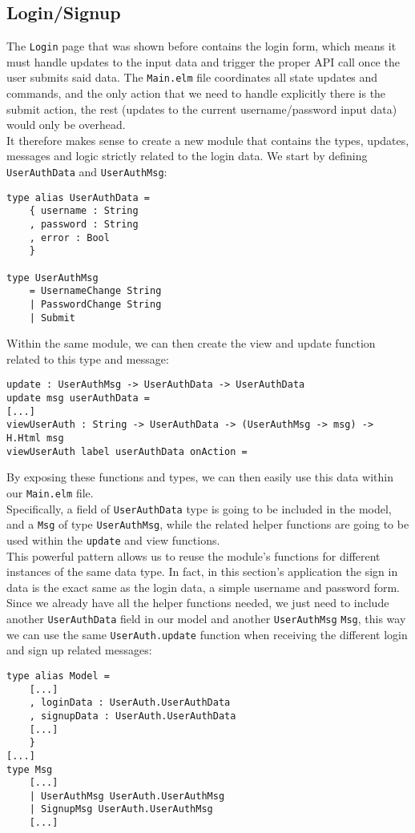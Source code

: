 \subsection{Login/Signup}

The \texttt{Login} page that was shown before contains the login form, which means it must handle updates to the input data and trigger the proper API call once the user submits said data. The \texttt{Main.elm} file coordinates all state updates and commands, and the only action that we need to handle explicitly there is the submit action, the rest (updates to the current username/password input data) would only be overhead.\\
It therefore makes sense to create a new module that contains the types, updates, messages and logic strictly related to the login data. We start by defining \texttt{UserAuthData} and \texttt{UserAuthMsg}:
\begin{verbatim}
type alias UserAuthData =
    { username : String
    , password : String
    , error : Bool
    }

type UserAuthMsg
    = UsernameChange String
    | PasswordChange String
    | Submit
\end{verbatim}

Within the same module, we can then create the view and update function related to this type and message:
\begin{verbatim}
update : UserAuthMsg -> UserAuthData -> UserAuthData
update msg userAuthData =
[...]
viewUserAuth : String -> UserAuthData -> (UserAuthMsg -> msg) -> H.Html msg
viewUserAuth label userAuthData onAction =
\end{verbatim}

By exposing these functions and types, we can then easily use this data within our \texttt{Main.elm} file.\\
Specifically, a field of \texttt{UserAuthData} type is going to be included in the model, and a \texttt{Msg} of type \texttt{UserAuthMsg}, while the related helper functions are going to be used within the \texttt{update} and view functions.\\

This powerful pattern allows us to reuse the module's functions for different instances of the same data type. In fact, in this section's application the sign in data is the exact same as the login data, a simple username and password form.\\ Since we already have all the helper functions needed, we just need to include another \texttt{UserAuthData} field in our model and another \texttt{UserAuthMsg}  \texttt{Msg}, this way we can use the same \texttt{UserAuth.update} function when receiving the different login and sign up related messages:
\begin{verbatim}  
type alias Model =
    [...]
    , loginData : UserAuth.UserAuthData
    , signupData : UserAuth.UserAuthData
    [...]
    }
[...]
type Msg
    [...]
    | UserAuthMsg UserAuth.UserAuthMsg
    | SignupMsg UserAuth.UserAuthMsg
    [...]
\end{verbatim}

